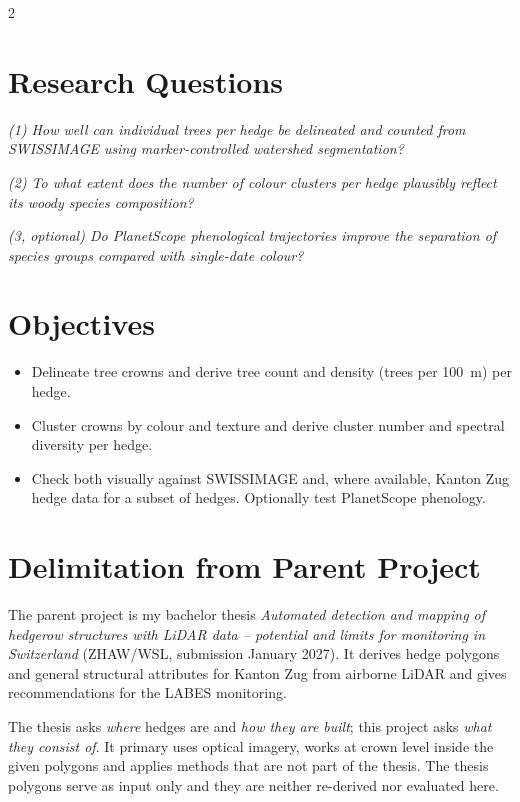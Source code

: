 \documentclass[10pt,a4paper]{article}
\begin{document}
\begin{multicols}{2}

\section*{Research Questions}

\emph{
(1) How well can individual trees per hedge be
delineated and counted from SWISSIMAGE using
marker-controlled watershed segmentation?
}

\emph{
(2) To what extent does the number of colour clusters
per hedge plausibly reflect its woody species
composition?
}

\emph{
(3, optional) Do PlanetScope phenological trajectories
improve the separation of species groups compared with
single-date colour?
}

\section*{Objectives}

\begin{itemize}

\item Delineate tree crowns and derive tree count and
density (trees per 100~m) per hedge.

\item Cluster crowns by colour and texture and derive
cluster number and spectral diversity per hedge.

\item Check both visually against SWISSIMAGE and, where
available, Kanton Zug hedge data for a subset of
hedges. Optionally test PlanetScope phenology.

\end{itemize}


\section*{Delimitation from Parent Project}

The parent project is my bachelor thesis
\emph{Automated detection and mapping of hedgerow
structures with LiDAR data -- potential and limits for
monitoring in Switzerland} (ZHAW/WSL, submission
January 2027). It derives hedge polygons and general structural
attributes for Kanton Zug from airborne LiDAR and gives
recommendations for the LABES monitoring.

The thesis asks \emph{where} hedges are and \emph{how
they are built}; this project asks \emph{what they
consist of}. It primary uses optical imagery, works at
crown level inside the given polygons and applies
methods that are not part of the thesis. The thesis polygons
serve as input only and they are neither re-derived nor evaluated here.


\end{multicols}
\end{document}
